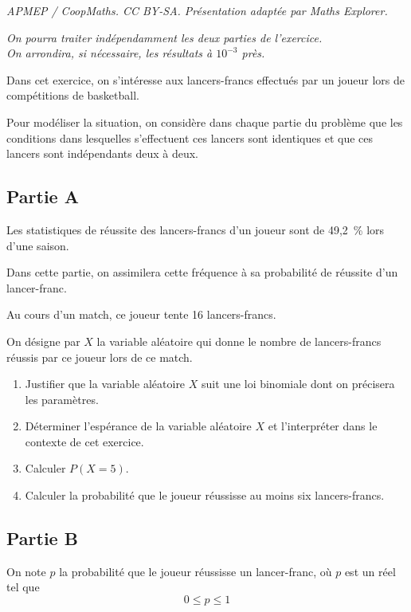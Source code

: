 \documentclass[10pt]{article}
\begin{document}
\noindent\textit{APMEP / CoopMaths. CC BY-SA. Présentation adaptée par Maths Explorer.}\par\medskip
\emph{On pourra traiter indépendamment les deux parties de l'exercice. \\
On arrondira, si nécessaire, les résultats à $10^{-3}$ près.}

\medskip
Dans cet exercice, on s'intéresse aux lancers-francs effectués par un joueur lors de compétitions de basketball.

Pour modéliser la situation, on considère dans chaque partie du problème que les conditions dans lesquelles s'effectuent ces lancers sont identiques et que ces lancers sont indépendants deux à deux.

\subsection*{Partie  A}
	Les statistiques de réussite des lancers-francs d'un joueur sont de 49,2~\% lors d'une saison.

	Dans cette partie, on assimilera cette fréquence à sa probabilité de réussite d'un lancer-franc.

	Au cours d'un match, ce joueur tente 16 lancers-francs.

	On désigne par $X$ la variable aléatoire qui donne le nombre de lancers-francs réussis par ce joueur lors de ce match.

	\begin{enumerate}
		\item Justifier que la variable aléatoire $X$ suit une loi binomiale dont on précisera les paramètres.

		\item Déterminer l'espérance de la variable aléatoire $X$ et l'interpréter dans le contexte de cet exercice.

		\item Calculer $P(X=5)$.

		\item Calculer la probabilité que le joueur réussisse au moins six lancers-francs.
	\end{enumerate}

\subsection*{Partie  B}
	On note $p$ la probabilité que le joueur réussisse un lancer-franc, où $p$ est un réel tel que
	\[0 \leqslant  p \leqslant  1\]
\end{document}
